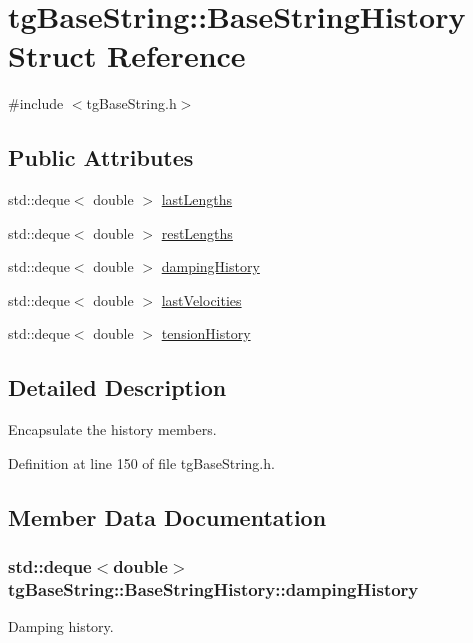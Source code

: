 \hypertarget{structtg_base_string_1_1_base_string_history}{\section{tg\-Base\-String\-:\-:Base\-String\-History Struct Reference}
\label{structtg_base_string_1_1_base_string_history}
}


{\ttfamily \#include $<$tg\-Base\-String.\-h$>$}

\subsection*{Public Attributes}
\begin{DoxyCompactItemize}
\item 
std\-::deque$<$ double $>$ \hyperlink{structtg_base_string_1_1_base_string_history_a9cb214114d51a5c43bbe820b0ebea690}{last\-Lengths}
\item 
std\-::deque$<$ double $>$ \hyperlink{structtg_base_string_1_1_base_string_history_aba048e0d7ddad106779a8f76fe8ccb0e}{rest\-Lengths}
\item 
std\-::deque$<$ double $>$ \hyperlink{structtg_base_string_1_1_base_string_history_a45f7d448b2c9dd487d47782f09822449}{damping\-History}
\item 
std\-::deque$<$ double $>$ \hyperlink{structtg_base_string_1_1_base_string_history_ae084154b0fccaafadeacf1f246f22115}{last\-Velocities}
\item 
std\-::deque$<$ double $>$ \hyperlink{structtg_base_string_1_1_base_string_history_a7488efc0119d4d2abeff29fc52606340}{tension\-History}
\end{DoxyCompactItemize}


\subsection{Detailed Description}
Encapsulate the history members. 

Definition at line 150 of file tg\-Base\-String.\-h.



\subsection{Member Data Documentation}
\hypertarget{structtg_base_string_1_1_base_string_history_a45f7d448b2c9dd487d47782f09822449}{
\subsubsection[{damping\-History}]{\setlength{\rightskip}{0pt plus 5cm}std\-::deque$<$double$>$ tg\-Base\-String\-::\-Base\-String\-History\-::damping\-History}}\label{structtg_base_string_1_1_base_string_history_a45f7d448b2c9dd487d47782f09822449}
Damping history. 

